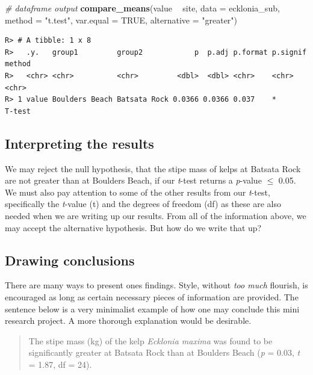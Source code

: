 \documentclass[english,10pt,a4paper,oneside]{book}
\newenvironment{Shaded}{\begin{snugshade}}{\end{snugshade}}
\newcommand{\CommentTok}[1]{\textcolor[rgb]{0.56,0.35,0.01}{\textit{#1}}}
\newcommand{\DataTypeTok}[1]{\textcolor[rgb]{0.13,0.29,0.53}{#1}}
\newcommand{\KeywordTok}[1]{\textcolor[rgb]{0.13,0.29,0.53}{\textbf{#1}}}
\newcommand{\NormalTok}[1]{#1}
\newcommand{\OperatorTok}[1]{\textcolor[rgb]{0.81,0.36,0.00}{\textbf{#1}}}
\newcommand{\OtherTok}[1]{\textcolor[rgb]{0.56,0.35,0.01}{#1}}
\newcommand{\StringTok}[1]{\textcolor[rgb]{0.31,0.60,0.02}{#1}}
\theoremstyle{definition}
\theoremstyle{definition}
\theoremstyle{definition}
\theoremstyle{remark}
\begin{document}
\begin{Shaded}
\begin{Highlighting}[]
\CommentTok{# dataframe output}
\KeywordTok{compare_means}\NormalTok{(value }\OperatorTok{~}\StringTok{ }\NormalTok{site, }\DataTypeTok{data =}\NormalTok{ ecklonia_sub, }\DataTypeTok{method =} \StringTok{"t.test"}\NormalTok{, }\DataTypeTok{var.equal =} \OtherTok{TRUE}\NormalTok{, }\DataTypeTok{alternative =} \StringTok{"greater"}\NormalTok{)}
\end{Highlighting}
\end{Shaded}

\begin{verbatim}
R> # A tibble: 1 x 8
R>   .y.   group1         group2            p  p.adj p.format p.signif method
R>   <chr> <chr>          <chr>         <dbl>  <dbl> <chr>    <chr>    <chr> 
R> 1 value Boulders Beach Batsata Rock 0.0366 0.0366 0.037    *        T-test
\end{verbatim}

\hypertarget{interpreting-the-results}{%
\subsection{Interpreting the results}\label{interpreting-the-results}}

We may reject the null hypothesis, that the stipe mass of kelps at
Batsata Rock are not greater than at Boulders Beach, if our
\emph{t}-test returns a \emph{p}-value \(\leq\) 0.05. We must also pay
attention to some of the other results from our \emph{t}-test,
specifically the \emph{t}-value (t) and the degrees of freedom (df) as
these are also needed when we are writing up our results. From all of
the information above, we may accept the alternative hypothesis. But how
do we write that up?

\hypertarget{drawing-conclusions}{%
\subsection{Drawing conclusions}\label{drawing-conclusions}}

There are many ways to present ones findings. Style, without \emph{too
much} flourish, is encouraged as long as certain necessary pieces of
information are provided. The sentence below is a very minimalist
example of how one may conclude this mini research project. A more
thorough explanation would be desirable.

\begin{quote}
The stipe mass (kg) of the kelp \emph{Ecklonia maxima} was found to be
significantly greater at Batsata Rock than at Boulders Beach (\emph{p} =
0.03, \emph{t} = 1.87, df = 24).
\end{quote}
\end{document}

